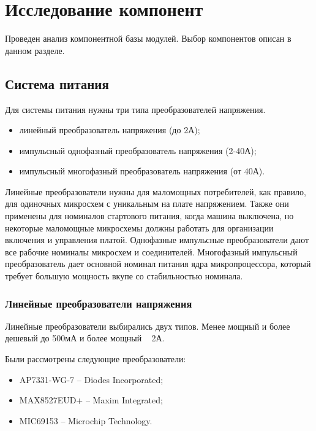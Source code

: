 \section{Исследование компонент}

Проведен анализ компонентной базы модулей. Выбор компонентов описан в данном разделе.

\subsection{Система питания}

Для системы питания нужны три типа преобразователей напряжения.

\begin{itemize}
	\item линейный преобразователь напряжения (до 2А);
	\item импульсный однофазный преобразователь напряжения (2-40А);
	\item импульсный многофазный преобразователь напряжения (от 40А).
\end{itemize}

Линейные преобразователи нужны для маломощных потребителей, как правило, для одиночных микросхем с уникальным на плате напряжением. Также они применены для номиналов стартового питания, когда машина выключена, но некоторые маломощные микросхемы должны работать для организации включения и управления платой. Однофазные импульсные преобразователи дают все рабочие номиналы микросхем и соединителей. Многофазный импульсный преобразователь дает основной номинал питания ядра микропроцессора, который требует большую мощность вкупе со стабильностью номинала.

\subsubsection{Линейные преобразователи напряжения}\label{linear_choose}

Линейные преобразователи выбирались двух типов. Менее мощный и более дешевый до 500мА и более мощный ~ 2А.

Были рассмотрены следующие преобразователи:
\begin{itemize}
	\item AP7331-WG-7 -- Diodes Incorporated;
	\item MAX8527EUD+ -- Maxim Integrated;
	\item MIC69153 -- Microchip Technology.
\end{itemize}

